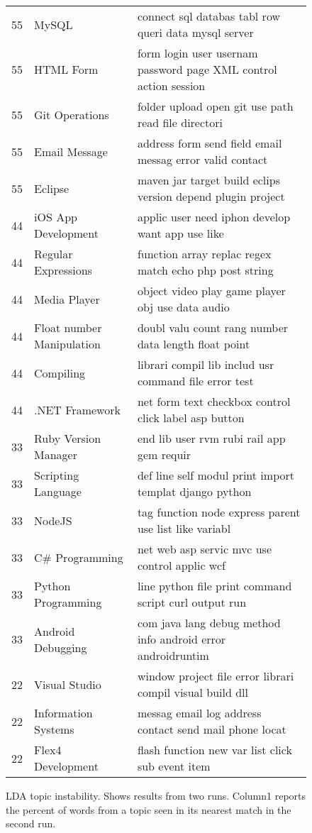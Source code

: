 \begin{figure*}[!t]
\begin{center}
\begin{tabular}{r|l|l}
55 &MySQL & connect sql databas tabl row queri data mysql server\\
55 &HTML Form & form login user usernam password page XML control action session\\
55 &Git Operations & folder upload open git use path read file directori\\
55 &Email Message & address form send field email messag error valid contact\\
55 &Eclipse & maven jar target build eclips version depend plugin project\\
44 &iOS App Development & applic user need iphon develop want app use like\\
44 &Regular Expressions & function array replac regex match echo php post string\\
44 &Media Player & object video play game player obj use data audio \\ 
44 &Float number Manipulation & doubl valu count rang number data length float point\\
44 &Compiling & librari compil lib includ usr command file error test\\
44 &.NET Framework & net form text checkbox control click label asp button\\
33 &Ruby Version Manager & end lib user rvm rubi rail app gem requir\\
33 &Scripting Language & def line self modul print import templat django python\\
33 &NodeJS & tag function node express parent use list like variabl\\
33 & C\# Programming & net web asp servic mvc use control applic wcf \\ 
33 & Python Programming & line python file print command script curl output run \\ 
33 &Android Debugging & com java lang debug method info android error androidruntim\\
22 & Visual Studio & window project file error librari compil visual build dll \\ 
22 & Information Systems & messag email log address contact send mail phone locat \\ 
22 &Flex4 Development & flash function new var list click sub event item
\end{tabular}
\end{center}
\caption{LDA topic instability. Shows results from two runs. Column1 reports the percent
of words from a topic seen in its nearest match in the second run.}
\label{fig:olap}
\end{figure*}
